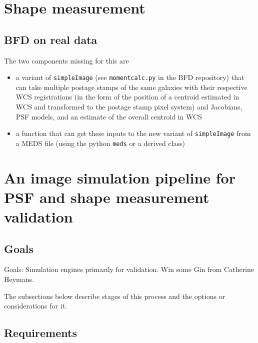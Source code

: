 \documentclass[\docopts]{\docclass}
\begin{document}

\section{Shape measurement}


\subsection{BFD on real data}


The two components missing for this are
\begin{itemize}
\item a variant of \texttt{simpleImage} (see \texttt{momentcalc.py} in the BFD repository) that can take multiple postage stamps of the same galaxies with their respective WCS registrations (in the form of the position of a centroid estimated in WCS and transformed to the postage stamp pixel system) and Jacobians, PSF models, and an estimate of the overall centroid in WCS 
\item a function that can get these inputs to the new variant of \texttt{simpleImage} from a MEDS file (using the python \texttt{meds} or a derived class) 
\end{itemize}



\section{An image simulation pipeline for PSF and shape measurement validation}


\subsection{Goals}
Goals: Simulation engines primarily for validation. Win some Gin from Catherine Heymans.

The subsections below describe stages of this process and the options or considerations for it.

\subsection{Requirements}
\end{document}
